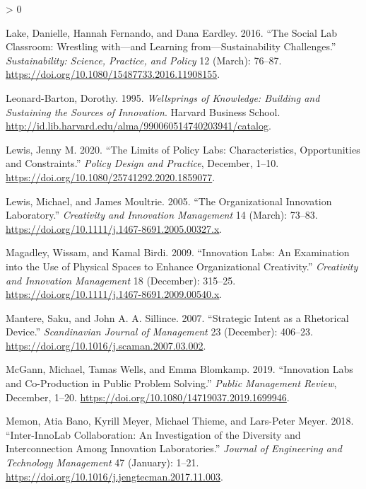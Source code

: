 \documentclass[AMA,STIX1COL,APA,STIX2COL]{WileyNJD-v2}
\newlength{\cslhangindent}
\newenvironment{CSLReferences}[2] %
 {%
  \setlength{\parindent}{0pt}
  \ifodd #1 \everypar{\setlength{\hangindent}{\cslhangindent}}\ignorespaces\fi
  \ifnum #2 > 0
  \setlength{\parskip}{#2\baselineskip}
  \fi
 }%
 {}
\begin{document}
\begin{CSLReferences}{1}{0}
\leavevmode\hypertarget{ref-Lake2016}{}%
Lake, Danielle, Hannah Fernando, and Dana Eardley. 2016. {``The Social
Lab Classroom: Wrestling with---and Learning from---Sustainability
Challenges.''} \emph{Sustainability: Science, Practice, and Policy} 12
(March): 76--87. \url{https://doi.org/10.1080/15487733.2016.11908155}.

\leavevmode\hypertarget{ref-Leonard1995}{}%
Leonard-Barton, Dorothy. 1995. \emph{Wellsprings of Knowledge: Building
and Sustaining the Sources of Innovation}. Harvard Business School.
\url{http://id.lib.harvard.edu/alma/990060514740203941/catalog}.

\leavevmode\hypertarget{ref-Lewis2020}{}%
Lewis, Jenny M. 2020. {``The Limits of Policy Labs: Characteristics,
Opportunities and Constraints.''} \emph{Policy Design and Practice},
December, 1--10. \url{https://doi.org/10.1080/25741292.2020.1859077}.

\leavevmode\hypertarget{ref-Lewis2005}{}%
Lewis, Michael, and James Moultrie. 2005. {``The Organizational
Innovation Laboratory.''} \emph{Creativity and Innovation Management} 14
(March): 73--83. \url{https://doi.org/10.1111/j.1467-8691.2005.00327.x}.

\leavevmode\hypertarget{ref-Magadley2009}{}%
Magadley, Wissam, and Kamal Birdi. 2009. {``Innovation Labs: An
Examination into the Use of Physical Spaces to Enhance Organizational
Creativity.''} \emph{Creativity and Innovation Management} 18
(December): 315--25.
\url{https://doi.org/10.1111/j.1467-8691.2009.00540.x}.

\leavevmode\hypertarget{ref-Mantere2007}{}%
Mantere, Saku, and John A. A. Sillince. 2007. {``Strategic Intent as a
Rhetorical Device.''} \emph{Scandinavian Journal of Management} 23
(December): 406--23. \url{https://doi.org/10.1016/j.scaman.2007.03.002}.

\leavevmode\hypertarget{ref-McGann2019}{}%
McGann, Michael, Tamas Wells, and Emma Blomkamp. 2019. {``Innovation
Labs and Co-Production in Public Problem Solving.''} \emph{Public
Management Review}, December, 1--20.
\url{https://doi.org/10.1080/14719037.2019.1699946}.

\leavevmode\hypertarget{ref-Memon2018}{}%
Memon, Atia Bano, Kyrill Meyer, Michael Thieme, and Lars-Peter Meyer.
2018. {``Inter-InnoLab Collaboration: An Investigation of the Diversity
and Interconnection Among Innovation Laboratories.''} \emph{Journal of
Engineering and Technology Management} 47 (January): 1--21.
\url{https://doi.org/10.1016/j.jengtecman.2017.11.003}.


\end{CSLReferences}
\end{document}
